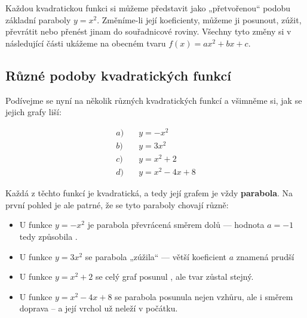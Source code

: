 \documentclass[12pt,a4paper]{article}
\begin{document}
Každou kvadratickou funkci si můžeme představit jako „přetvořenou“ podobu základní paraboly \(y=x^2\).  
Změníme-li její koeficienty, můžeme ji posunout, zúžit, převrátit nebo přenést jinam do souřadnicové roviny.  
Všechny tyto změny si v následující části ukážeme na obecném tvaru \(f(x) = ax^2 + bx + c\).

\subsection{Různé podoby kvadratických funkcí}

\begin{examplebox}
Podívejme se nyní na několik různých kvadratických funkcí a všimněme si, jak se jejich grafy liší:

\[
\begin{aligned}
a)\quad & y = -x^2\\[4pt]
b)\quad & y = 3x^2\\[4pt]
c)\quad & y = x^2 + 2\\[4pt]
d)\quad & y = x^2 - 4x + 8
\end{aligned}
\]

Každá z těchto funkcí je kvadratická, a tedy její grafem je vždy \textbf{parabola}.  
Na první pohled je ale patrné, že se tyto paraboly chovají různě:
\begin{itemize}
  \item U funkce \(y = -x^2\) je parabola převrácená směrem dolů — hodnota \(a = -1\) tedy způsobila .
  \item U funkce \(y = 3x^2\) se parabola „zúžila“ — větší koeficient \(a\) znamená prudší 
  \item U funkce \(y = x^2 + 2\) se celý graf posunul , ale tvar zůstal stejný.
  \item U funkce \(y = x^2 - 4x + 8\) se parabola posunula nejen vzhůru, ale i směrem doprava – a její vrchol už neleží v počátku.
\end{itemize}
\end{examplebox}
\end{document}
